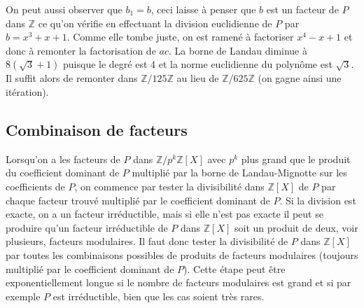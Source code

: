 \documentclass[a4paper,11pt]{book}
\begin{document}
\begin{giacjshere}
On peut aussi observer que $b_1=b$, ceci laisse à penser que $b$ est 
un facteur de $P$ dans $\mathbb{Z}$ ce qu'on vérifie en effectuant la
division euclidienne de $P$ par $b=x^3+x+1$. Comme elle tombe
juste, on est ramené à factoriser $x^4-x+1$ et donc à remonter
la factorisation de $ac$. La borne de Landau diminue à $8(\sqrt{3}+1)$
puisque le degré est 4 et la norme euclidienne du polynôme est $\sqrt{3}$.
Il suffit alors de remonter dans $\mathbb{Z}/125 \mathbb{Z}$ au lieu de $\mathbb{Z}/625 \mathbb{Z}$
(on gagne ainsi une itération).

\subsection{Combinaison de facteurs}
Lorsqu'on a les facteurs de $P$ dans $\mathbb{Z}/p^k\mathbb{Z}[X]$ avec $p^k$ plus grand
que le produit du coefficient dominant de $P$ multiplié par la borne
de Landau-Mignotte sur les coefficients de $P$, on commence par
tester la divisibilité dans $\mathbb{Z}[X]$ de $P$ par chaque facteur trouvé
multiplié par le coefficient dominant de $P$. Si la division est
exacte, on a un facteur irréductible, mais si elle n'est pas exacte
il peut se produire qu'un facteur irréductible de $P$ dans $\mathbb{Z}[X]$ soit un
produit de deux, voir plusieurs, facteurs modulaires. Il faut
donc tester la divisibilité de $P$ dans $\mathbb{Z}[X]$ par toutes les combinaisons 
possibles de produits de facteurs modulaires (toujours multiplié par
le coefficient dominant de $P$). Cette étape peut être exponentiellement
longue si le nombre de facteurs modulaires est grand et si par
exemple $P$ est irréductible, bien que les cas soient très rares. 


\end{giacjshere}
\end{document}
